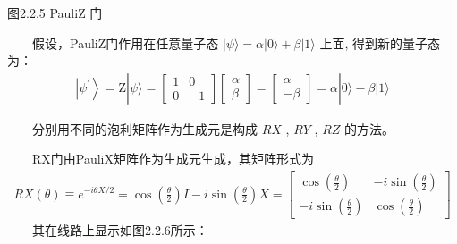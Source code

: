 \documentclass[a4paper,11pt,english]{sphinxmanual}
\begin{document}

\begin{center}图2.2.5 Pauli\sphinxhyphen{}Z 门
\end{center}
\sphinxAtStartPar
  假设，Pauli\sphinxhyphen{}Z门作用在任意量子态 \(|\psi\rangle=\alpha|0\rangle + \beta|1\rangle\) 上面, 得到新的量子态为：
\begin{equation*}
\begin{split}\left|\psi^{\prime}\right\rangle=\mathrm{Z}|\psi\rangle=\left[\begin{array}{cc} 1 & 0 \\ 0 & -1 \end{array}\right]\left[\begin{array}{l} \alpha \\ \beta \end{array}\right]=\left[\begin{array}{c} \alpha \\ -\beta \end{array}\right]=\alpha|0\rangle-\beta|1\rangle\end{split}
\end{equation*}
\sphinxAtStartPar
{}

\sphinxAtStartPar
  分别用不同的泡利矩阵作为生成元是构成 \(RX\) , \(RY\) , \(RZ\) 的方法。

\sphinxAtStartPar
{}

\sphinxAtStartPar
  RX门由Pauli\sphinxhyphen{}X矩阵作为生成元生成，其矩阵形式为
\begin{equation*}
\begin{split}RX(\theta) \equiv e^{-i \theta X / 2}=\cos \left(\frac{\theta}{2}\right) I-i \sin \left(\frac{\theta}{2}\right) X=\left[\begin{array}{cc} \cos \left(\frac{\theta}{2}\right) & -i \sin \left(\frac{\theta}{2}\right) \\ -i \sin \left(\frac{\theta}{2}\right) & \cos \left(\frac{\theta}{2}\right) \end{array}\right]\end{split}
\end{equation*}
\sphinxAtStartPar
  其在线路上显示如图2.2.6所示：

\end{document}
